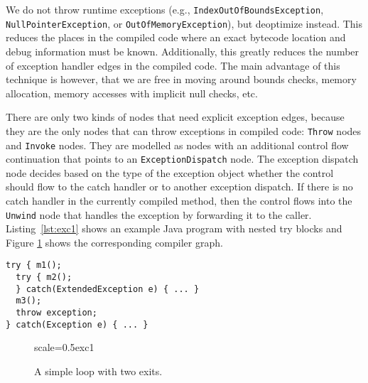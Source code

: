 \documentclass[twocolumn]{svjour3}
\begin{document}
We do not throw runtime exceptions (e.g., \texttt{IndexOutOf\-BoundsException}, \texttt{Null\-Pointer\-Exception}, or \texttt{Out\-Of\-Memory\-Exception}), but deoptimize instead.
This reduces the places in the compiled code where an exact bytecode location and debug information must be known.
Additionally, this greatly reduces the number of exception handler edges in the compiled code.
The main advantage of this technique is however, that we are free in moving around bounds checks, memory allocation, memory accesses with implicit null checks, etc.

There are only two kinds of nodes that need explicit exception edges, because they are the only nodes that can throw exceptions in compiled code: \texttt{Throw} nodes and \texttt{Invoke} nodes.
They are modelled as nodes with an additional control flow continuation that points to an \texttt{ExceptionDispatch} node.
The exception dispatch node decides based on the type of the exception object whether the control should flow to the catch handler or to another exception dispatch.
If there is no catch handler in the currently compiled method, then the control flows into the \texttt{Unwind} node that handles the exception by forwarding it to the caller.
Listing~\ref{lst:exc1} shows an example Java program with nested try blocks and Figure \ref{fig:exc1} shows the corresponding compiler graph.

\begin{lstlisting}[label=lst:exc1, caption=Exception dispatch in the compiler graph., captionpos=b]
try { m1();
  try { m2();
  } catch(ExtendedException e) { ... }
  m3();
  throw exception;
} catch(Exception e) { ... }
\end{lstlisting}

\begin{figure}[ht]
  \centering
\begin{digraphenv}{scale=0.5}{exc1}
\end{digraphenv}
  \caption{A simple loop with two exits.}
  \label{fig:exc1}
\end{figure}
\end{document}
